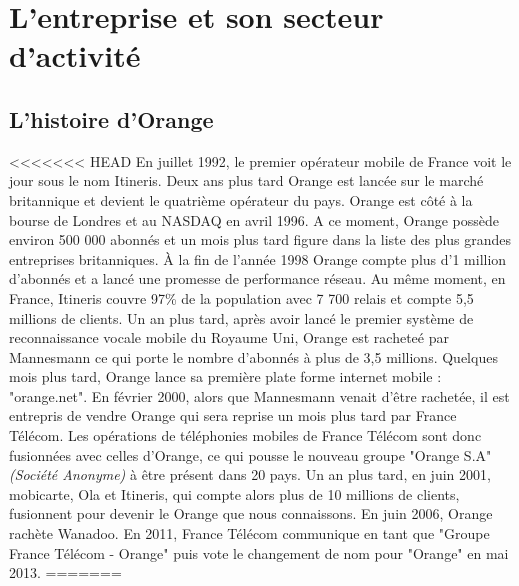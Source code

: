 \chapter{L'entreprise et son secteur d'activité}
\label{chap:premierchapitre}

\section{L'histoire d'Orange}


<<<<<<< HEAD
En juillet 1992, le premier opérateur mobile  de France voit le jour sous le nom Itineris. Deux ans plus tard Orange est lancée sur le marché britannique et devient le quatrième opérateur du pays. Orange est côté à la bourse de Londres et au NASDAQ en avril 1996. A ce moment, Orange possède environ 500 000 abonnés et un mois plus tard figure dans la liste des plus grandes entreprises britanniques. À la fin de l'année 1998 Orange compte plus d'1 million d'abonnés et a lancé une promesse de performance réseau. Au même moment, en France, Itineris couvre 97\% de la population avec 7 700 relais et compte 5,5 millions de clients. Un an plus tard, après avoir lancé le premier système de reconnaissance vocale mobile du Royaume Uni, Orange est racheteé par Mannesmann ce qui porte le nombre d'abonnés à plus de 3,5 millions. Quelques mois plus tard, Orange lance sa première plate forme internet mobile : "orange.net". En février 2000, alors que Mannesmann venait d'être rachetée, il est entrepris de vendre Orange qui sera reprise un mois plus tard par France Télécom. Les opérations de téléphonies mobiles de France Télécom sont donc fusionnées avec celles d'Orange, ce qui pousse le nouveau groupe "Orange S.A" \textit{(Société Anonyme)} à être présent dans 20 pays. Un an plus tard, en juin 2001, mobicarte, Ola et Itineris, qui compte alors plus de 10 millions de clients, fusionnent pour devenir le Orange que nous connaissons. En juin 2006, Orange rachète Wanadoo. En 2011, France Télécom communique en tant que "Groupe France Télécom - Orange" puis vote le changement de nom pour "Orange" en mai 2013.
=======

